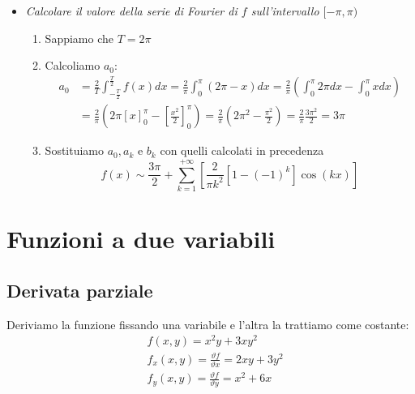 \documentclass[10pt, a4paper]{article}
\begin{document}
\begin{itemize}
\begin{enumerate}
\begin{equation*}
            \end{equation*}
        \end{enumerate}
        \item \textit{Calcolare il valore della serie di Fourier di $f$ sull'intervallo $[-\pi,\pi)$} \begin{enumerate}
            \item Sappiamo che $T=2\pi$
            \item Calcoliamo $a_0$: \begin{equation*}
                \begin{split}
                    a_0 &= \frac{2}{T}\int_{-\frac{T}{2}}^{\frac{T}{2}}f(x)dx=\frac{2}{\pi}\int_{0}^{\pi}(2\pi-x)dx=\frac{2}{\pi}\left(\int_{0}^{\pi}2\pi dx-\int_{0}^{\pi}x dx\right)\\
                    &=\frac{2}{\pi}\left(2\pi\left[x\right]_{0}^{\pi}-\left[\frac{x^2}{2}\right]_{0}^{\pi}\right)=\frac{2}{\pi}\left(2\pi^2-\frac{\pi^2}{2}\right)=\frac{2}{\pi}\frac{3\pi^2}{2}=3\pi
                \end{split}
            \end{equation*}
            \item Sostituiamo $a_0, a_k \text{ e } b_k$ con quelli calcolati in precedenza \begin{equation*}
                f(x) \sim \frac{3\pi}{2}+\sum_{k=1}^{+\infty}\left[\frac{2}{\pi k^2}[1-(-1)^k]\cos\left(kx\right)\right]                
            \end{equation*}
        \end{enumerate}
    \end{itemize}
\section{Funzioni a due variabili}
    \subsection{Derivata parziale}
        Deriviamo la funzione fissando una variabile e l'altra la trattiamo come costante:
        \begin{equation*}
            \begin{split}
                &f(x,y)=x^2y+3xy^2 \\
                &f_x(x,y)=\frac{\vartheta f}{\vartheta x}=2xy+3y^2\\
                &f_y(x,y)=\frac{\vartheta f}{\vartheta y}=x^2+6x
            \end{split}
        \end{equation*}
\end{document}
